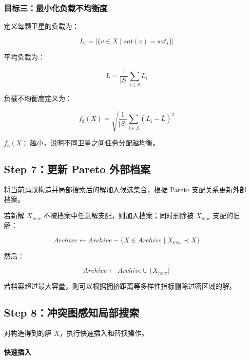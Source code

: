 \documentclass[UTF8,a4paper,12pt]{ctexart}
\begin{document}
\subsubsection{目标三：最小化负载不均衡度}

定义每颗卫星的负载为：

\begin{equation}
L_i=|\{v\in X\mid sat(v)=sat_i\}|
\end{equation}

平均负载为：

\begin{equation}
\bar{L}=\frac{1}{|S|}\sum_{i\in S}L_i
\end{equation}

负载不均衡度定义为：

\begin{equation}
f_3(X)=
\sqrt{
\frac{1}{|S|}
\sum_{i\in S}(L_i-\bar{L})^2
}
\end{equation}

$f_3(X)$ 越小，说明不同卫星之间任务分配越均衡。

\subsection{Step 7：更新 Pareto 外部档案}

将当前蚂蚁构造并局部搜索后的解加入候选集合，根据 Pareto 支配关系更新外部档案。

若新解 $X_{new}$ 不被档案中任意解支配，则加入档案；同时删除被 $X_{new}$ 支配的旧解：

\begin{equation}
Archive \leftarrow Archive-\{X\in Archive\mid X_{new}\prec X\}
\end{equation}

然后：

\begin{equation}
Archive\leftarrow Archive\cup \{X_{new}\}
\end{equation}

若档案超过最大容量，则可以根据拥挤距离等多样性指标删除过密区域的解。

\subsection{Step 8：冲突图感知局部搜索}

对构造得到的解 $X$，执行快速插入和替换操作。

\paragraph{快速插入}
\end{document}
